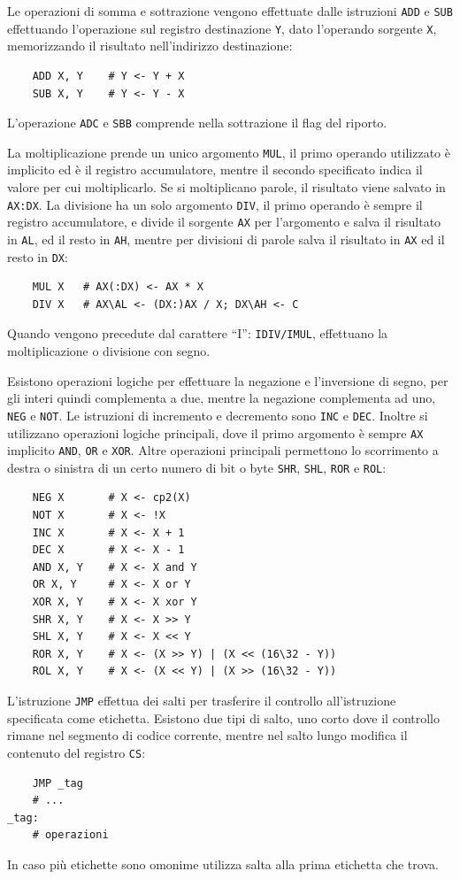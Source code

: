 \documentclass{article}
\numberwithin{equation}{subsection}
\begin{document}
Le operazioni di somma e sottrazione vengono effettuate dalle istruzioni \verb|ADD| e \verb|SUB| effettuando l'operazione sul registro destinazione \verb|Y|, dato l'operando sorgente \verb|X|,  
memorizzando il risultato nell'indirizzo destinazione:
\begin{verbatim}
    ADD X, Y    # Y <- Y + X    
    SUB X, Y    # Y <- Y - X
\end{verbatim}
L'operazione \verb|ADC| e \verb|SBB| comprende nella sottrazione il flag del riporto. 


La moltiplicazione prende un unico argomento \verb|MUL|, il primo operando utilizzato è implicito ed è il registro accumulatore, mentre il secondo specificato indica 
il valore per cui moltiplicarlo. Se si moltiplicano parole, il risultato viene salvato in \verb|AX:DX|. 
La divisione ha un solo argomento \verb|DIV|, il primo operando è sempre il registro accumulatore, e divide il sorgente \verb|AX| per l'argomento e salva il risultato in \verb|AL|, ed il 
resto in \verb|AH|, mentre per divisioni di parole salva il risultato in \verb|AX| ed il resto in \verb|DX|: 
\begin{verbatim}
    MUL X   # AX(:DX) <- AX * X
    DIV X   # AX\AL <- (DX:)AX / X; DX\AH <- C
\end{verbatim}
Quando vengono precedute dal carattere ``I'': \verb|IDIV/IMUL|, effettuano la moltiplicazione o divisione con segno. 


Esistono operazioni logiche per effettuare la negazione e l'inversione di segno, per gli interi quindi complementa a due, mentre la negazione complementa ad uno, \verb|NEG| e 
\verb|NOT|. Le istruzioni di incremento e decremento sono \verb|INC| e \verb|DEC|. Inoltre si utilizzano operazioni logiche principali, dove il primo argomento è 
sempre \verb|AX| implicito \verb|AND|, \verb|OR| e \verb|XOR|. 
Altre operazioni principali permettono lo scorrimento a destra o sinistra di un certo numero di bit o byte \verb|SHR|, \verb|SHL|, \verb|ROR| e \verb|ROL|:
\begin{verbatim}
    NEG X       # X <- cp2(X)
    NOT X       # X <- !X
    INC X       # X <- X + 1
    DEC X       # X <- X - 1
    AND X, Y    # X <- X and Y
    OR X, Y     # X <- X or Y
    XOR X, Y    # X <- X xor Y 
    SHR X, Y    # X <- X >> Y 
    SHL X, Y    # X <- X << Y
    ROR X, Y    # X <- (X >> Y) | (X << (16\32 - Y))
    ROL X, Y    # X <- (X << Y) | (X >> (16\32 - Y))      
\end{verbatim}

L'istruzione \verb|JMP| effettua dei salti per trasferire il controllo all'istruzione specificata come etichetta. Esistono due tipi di salto, uno corto dove il controllo rimane 
nel segmento di codice corrente, mentre nel salto lungo modifica il contenuto del registro \verb|CS|:
\begin{verbatim}
    JMP _tag
    # ...
_tag:
    # operazioni
\end{verbatim}
In caso più etichette sono omonime utilizza salta alla prima etichetta che trova. 
\end{document}
